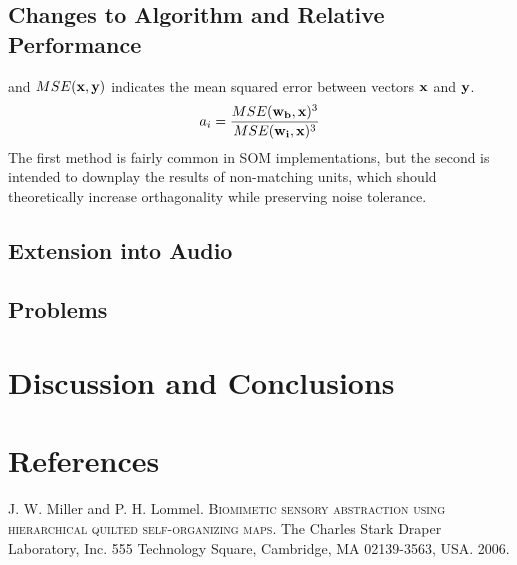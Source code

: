 \documentclass[a4paper,10pt]{article}
\begin{document}
\subsection{Changes to Algorithm and Relative Performance}

and $MSE(\bold{x},\bold{y})$ indicates the mean squared error between vectors $\bold{x}$ and
$\bold{y}$.
\begin{equation} \label{eq:MSEMETH}
 a_i = \frac{MSE(\bold{w_b}, \bold{x})^3}{MSE(\bold{w_i},\bold{x})^3}
\end{equation}
The first method is fairly common in SOM implementations, but the second is intended to downplay the
results of non-matching units, which should theoretically increase orthagonality while preserving
noise tolerance.

\subsection{Extension into Audio}
\subsection{Problems}
\section{Discussion and Conclusions}
\section{References}

\begin{thebibliography}{}
 J. W. Miller and P. H. Lommel. \textsc{Biomimetic sensory abstraction using
hierarchical quilted self-organizing maps}. The Charles Stark Draper Laboratory, Inc.
555 Technology Square, Cambridge, MA 02139-3563, USA. 2006.
\end{thebibliography}
\end{document}

